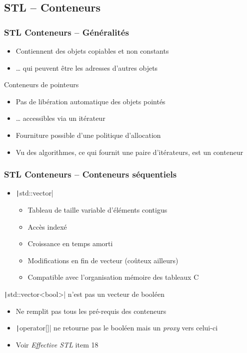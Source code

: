 \documentclass[C++.tex]{subfiles}
\begin{document}
\subsection*{STL -- Conteneurs}
\begin{frame}[fragile]
	\frametitle{STL Conteneurs -- Généralités}
	\begin{itemize}
		\item Contiennent des objets copiables et non constants
		\item \ldots{} qui peuvent être les adresses d'autres objets
	\end{itemize}

	\begin{alertblock}{Conteneurs de pointeurs}
		\begin{itemize}
			\item Pas de libération automatique des objets pointés
		\end{itemize}
	\end{alertblock}

	\begin{itemize}
		\item \ldots{} accessibles via un itérateur
		\item Fourniture possible d'une politique d'allocation
		\item Vu des algorithmes, ce qui fournit une paire d'itérateurs, est un conteneur
	\end{itemize}
\end{frame}

\begin{frame}[fragile]
	\frametitle{STL Conteneurs -- Conteneurs séquentiels}
	\begin{itemize}
		\item \texttt|std::vector|
		\begin{itemize}
			\item Tableau de taille variable d'éléments contigus
			\item Accès indexé
			\item Croissance en temps amorti
			\item Modifications en fin de vecteur (coûteux ailleurs)
			\item Compatible avec l'organisation mémoire des tableaux C
		\end{itemize}
	\end{itemize}

	\begin{alertblock}{\texttt|std::vector<bool>| n'est pas un vecteur de booléen}
		\begin{itemize}
			\item Ne remplit pas tous les pré-requis des conteneurs
			\item \texttt|operator[]| ne retourne pas le booléen mais un \textit{proxy} vers celui-ci
			\item Voir \textit{Effective STL} item 18
		\end{itemize}
	\end{alertblock}
\end{frame}
\end{document}
